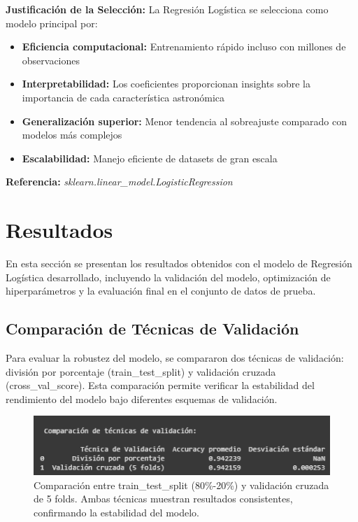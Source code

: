 \documentclass{article}
\begin{document}
\textbf{Justificación de la Selección:}
La Regresión Logística se selecciona como modelo principal por:
\begin{itemize}
    \item \textbf{Eficiencia computacional:} Entrenamiento rápido incluso con millones de observaciones
    \item \textbf{Interpretabilidad:} Los coeficientes proporcionan insights sobre la importancia de cada característica astronómica
    \item \textbf{Generalización superior:} Menor tendencia al sobreajuste comparado con modelos más complejos
    \item \textbf{Escalabilidad:} Manejo eficiente de datasets de gran escala
\end{itemize}

\textbf{Referencia:} \textit{sklearn.linear\_model.LogisticRegression} \cite{sklearn_lr}

\newpage

\section{Resultados}

En esta sección se presentan los resultados obtenidos con el modelo de Regresión Logística desarrollado, incluyendo la validación del modelo, optimización de hiperparámetros y la evaluación final en el conjunto de datos de prueba.

\subsection{Comparación de Técnicas de Validación}

Para evaluar la robustez del modelo, se compararon dos técnicas de validación: división por porcentaje (train\_test\_split) y validación cruzada (cross\_val\_score). Esta comparación permite verificar la estabilidad del rendimiento del modelo bajo diferentes esquemas de validación.

\begin{figure}[H]
    \centering
    \includegraphics[width=0.8\linewidth]{validacion.png}
    \caption{Comparación entre train\_test\_split (80\%-20\%) y validación cruzada de 5 folds. Ambas técnicas muestran resultados consistentes, confirmando la estabilidad del modelo.}
    \label{fig:validacion}
\end{figure}
\end{document}
